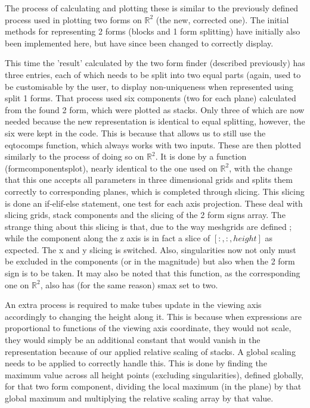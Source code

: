 \documentclass[11]{report}
\begin{document}
The process of calculating and plotting these is similar to the previously defined process used in plotting two forms on $\mathbb{R}^{2}$ (the new, corrected one). The initial methods for representing 2 forms (blocks and 1 form splitting) have initially also been implemented here, but have since been changed to correctly display.

This time the 'result' calculated by the two form finder (described previously) has three entries, each of which needs to be split into two equal parts (again, used to be customisable by the user, to display non-uniqueness when represented using split 1 forms. That process used six components (two for each plane) calculated from the found 2 form, which were plotted as stacks. Only three of which are now needed because the new representation is identical to equal splitting, however, the six were kept in the code. This is because that allows us to still use the eq\textunderscore to\textunderscore comps function, which always works with two inputs. These are then plotted similarly to the process of doing so on $\mathbb{R}^{2}$. It is done by a function (form\textunderscore components\textunderscore plot), nearly identical to the one used on $\mathbb{R}^{2}$, with the change that this one accepts all parameters in three dimensional grids and splits them correctly to corresponding planes, which is completed through slicing.
This slicing is done an if-elif-else statement, one test for each axis projection. These deal with slicing grids, stack components and the slicing of the 2 form signs array.
The strange thing about this slicing is that, due to the way meshgrids are defined ; while the component along the z axis is in fact a slice of $[:, :, height]$ as expected. The x and y slicing is switched.
Also, singularities now not only must be excluded in the components (or in the magnitude) but also when the 2 form sign is to be taken.
It may also be noted that this function, as the corresponding one on $\mathbb{R}^{2}$, also has (for the same reason) s\textunderscore max set to two.

\noindent An extra process is required to make tubes update in the viewing axis accordingly to changing the height along it. This is because when expressions are proportional to functions of the viewing axis coordinate, they would not scale, they would simply be an additional constant that would vanish in the representation because of our applied relative scaling of stacks. A global scaling needs to be applied to correctly handle this.
This is done by finding the maximum value across all height points (excluding singularities), defined globally, for that two form component, dividing the local maximum (in the plane) by that global maximum and multiplying the relative scaling array by that value.
\end{document}

